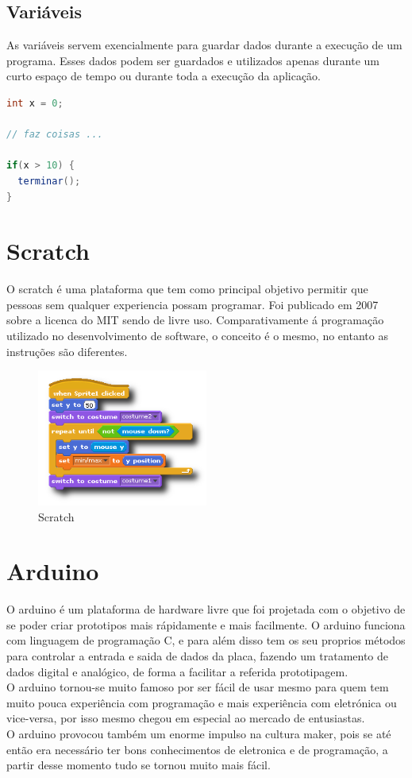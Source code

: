 \documentclass{article}
\begin{document}
\subsection{Variáveis}
As variáveis servem exencialmente para guardar dados durante a execução de um programa. Esses dados podem ser guardados e utilizados apenas durante um curto espaço de tempo ou durante toda a execução da aplicação.
\begin{lstlisting}[language=Java]
int x = 0;

// faz coisas ...

if(x > 10) {
  terminar();
}
\end{lstlisting}

\section{Scratch}
O scratch é uma plataforma que tem como principal objetivo permitir que pessoas sem qualquer experiencia possam programar. Foi publicado em 2007 sobre a licenca do MIT sendo de livre uso.\newline
Comparativamente á programação utilizado no desenvolvimento de software, o conceito é o mesmo, no entanto as instruções são diferentes.

\begin{figure}[h]
\centering
\includegraphics[width=0.5\textwidth]{img/scratch}
\caption{Scratch}
\end{figure}

\section{Arduino}
O arduino é um plataforma de hardware livre que foi projetada com o objetivo de se poder criar prototipos mais rápidamente e mais facilmente. O arduino funciona com linguagem de programação C, e para além disso tem os seu proprios métodos para controlar a entrada e saida de dados da placa, fazendo um tratamento de dados digital e analógico, de forma a facilitar a referida prototipagem.\newline \\
O arduino tornou-se muito famoso por ser fácil de usar mesmo para quem tem muito pouca experiência com programação e mais experiência com eletrónica ou vice-versa, por isso mesmo chegou em especial ao mercado de entusiastas.\newline \\
O arduino provocou também um enorme impulso na cultura maker, pois se até então era necessário ter bons conhecimentos de eletronica e de programação, a partir desse momento tudo se tornou muito mais fácil.\newline \\
\end{document}
